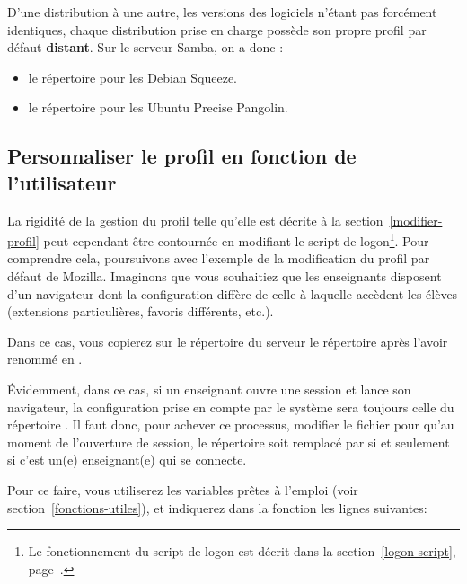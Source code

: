 \begin{alerte}
D'une distribution à une autre, les versions des logiciels n'étant
pas forcément identiques, chaque distribution prise en charge possède
son propre profil par défaut \textbf{distant}. Sur le serveur Samba, on a donc :
\begin{itemize}
\item le répertoire  pour les
Debian Squeeze.
\item le répertoire  pour les
Ubuntu Precise Pangolin.
\end{itemize}
\end{alerte}

\subsection{Personnaliser le profil en fonction de l'utilisateur}
\label{personnaliser-profil}

La rigidité de la gestion du profil telle qu'elle est décrite à la section~\ref{modifier-profil} 
peut cependant être contournée en modifiant le script de logon\footnote{Le fonctionnement du script 
de logon est décrit dans la section~\ref{logon-script}, page~\pageref{logon-script}.}. Pour comprendre 
cela, poursuivons avec l'exemple de la modification du profil par défaut de Mozilla. Imaginons que vous 
souhaitiez que les enseignants disposent d'un navigateur dont la configuration diffère de celle à laquelle 
accèdent les élèves (extensions particulières, favoris différents, etc.).

Dans ce cas, vous copierez sur le répertoire  du serveur le répertoire 
 après l'avoir renommé en .

Évidemment, dans ce cas, si un enseignant ouvre une session et lance son navigateur, la 
configuration prise en compte par le système sera toujours celle du répertoire . 
Il faut donc, pour achever ce processus, modifier le fichier  pour 
qu'au moment de l'ouverture de session, le répertoire  soit remplacé 
par  si et seulement si c'est un(e) enseignant(e) qui se connecte.

Pour ce faire, vous utiliserez les variables prêtes à l'emploi (voir section~\ref{fonctions-utiles}), 
et indiquerez dans la fonction  les lignes suivantes:

